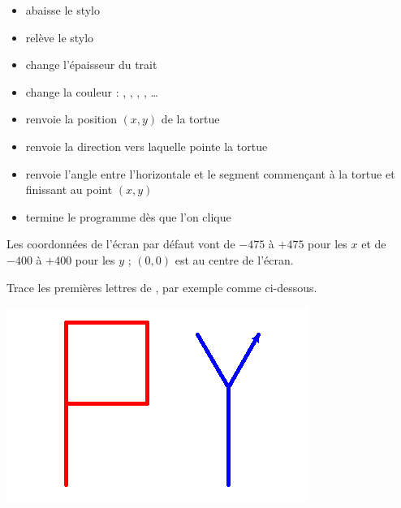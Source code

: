 \documentclass[11pt,class=report,crop=false]{standalone}
\begin{document}
\begin{cours}
\begin{itemize}
  
  \item {} abaisse le stylo
  \item {} relève le stylo
  \item {} change l'épaisseur du trait
  \item {} change la couleur : , , , , \ldots
  
  \item {}  renvoie la position $(x,y)$ de la tortue
  \item {} renvoie la direction  vers laquelle pointe la tortue
  \item {} renvoie l'angle entre l'horizontale et le segment commençant à la tortue et finissant au point $(x,y)$
  \item {} termine le programme dès que l'on clique
\end{itemize}

Les coordonnées de l'écran par défaut vont de $-475$ à $+475$ pour les $x$ et
de $-400$ à $+400$ pour les $y$ ; $(0,0)$ est au centre de l'écran.


\end{cours}



\begin{activite}


Trace les premières lettres de \Python{}, par exemple comme ci-dessous.

\begin{center}
\includegraphics[scale=\myscale,scale=0.4]{ecran-tortue-1}
\end{center}

\end{activite}
\end{document}
